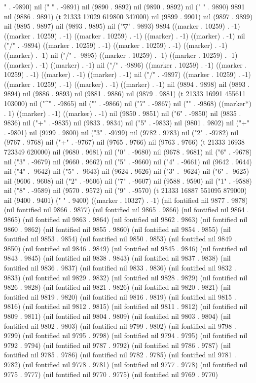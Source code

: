 {{" . -9890) nil (" " . -9891) nil (9890 . 9892) nil (9890 . 9892) nil (" " . 9890) 9891 nil (9886 . 9891) (t 21333 17029 619800 347000) nil (9899 . 9901) nil (9897 . 9899) nil (9895 . 9897) nil (9893 . 9895) nil ("▽" . 9893) 9894 ((marker . 10259) . -1) ((marker . 10259) . -1) ((marker . 10259) . -1) ((marker) . -1) ((marker) . -1) nil ("/" . -9894) ((marker . 10259) . -1) ((marker . 10259) . -1) ((marker) . -1) ((marker) . -1) nil ("/" . -9895) ((marker . 10259) . -1) ((marker . 10259) . -1) ((marker) . -1) ((marker) . -1) nil ("/" . -9896) ((marker . 10259) . -1) ((marker . 10259) . -1) ((marker) . -1) ((marker) . -1) nil ("/" . -9897) ((marker . 10259) . -1) ((marker . 10259) . -1) ((marker) . -1) ((marker) . -1) nil (9894 . 9898) nil (9893 . 9894) nil (9886 . 9893) nil (9881 . 9886) nil (9879 . 9881) (t 21333 16991 455611 103000) nil ("^" . -9865) nil ("{" . -9866) nil ("7" . -9867) nil ("}" . -9868) ((marker*) . 1) ((marker) . -1) ((marker) . -1) nil (9850 . 9851) nil ("6" . -9850) nil (9835 . 9836) nil ("+" . -9835) nil (9833 . 9834) nil ("5" . -9833) nil (9801 . 9802) nil ("+" . -9801) nil (9799 . 9800) nil ("3" . -9799) nil (9782 . 9783) nil ("2" . -9782) nil (9767 . 9768) nil ("+" . -9767) nil (9765 . 9766) nil (9763 . 9766) (t 21333 16938 723349 620000) nil (9680 . 9681) nil ("0" . -9680) nil (9678 . 9681) nil ("6" . -9678) nil ("3" . -9679) nil (9660 . 9662) nil ("5" . -9660) nil ("4" . -9661) nil (9642 . 9644) nil ("4" . -9642) nil ("5" . -9643) nil (9624 . 9626) nil ("3" . -9624) nil ("6" . -9625) nil (9606 . 9608) nil ("2" . -9606) nil ("7" . -9607) nil (9588 . 9590) nil ("1" . -9588) nil ("8" . -9589) nil (9570 . 9572) nil ("9" . -9570) (t 21333 16887 551095 879000) nil (9400 . 9401) ("  " . 9400) ((marker . 10327) . -1) (nil fontified nil 9877 . 9878) (nil fontified nil 9866 . 9877) (nil fontified nil 9865 . 9866) (nil fontified nil 9864 . 9865) (nil fontified nil 9863 . 9864) (nil fontified nil 9862 . 9863) (nil fontified nil 9860 . 9862) (nil fontified nil 9855 . 9860) (nil fontified nil 9854 . 9855) (nil fontified nil 9853 . 9854) (nil fontified nil 9850 . 9853) (nil fontified nil 9849 . 9850) (nil fontified nil 9846 . 9849) (nil fontified nil 9845 . 9846) (nil fontified nil 9843 . 9845) (nil fontified nil 9838 . 9843) (nil fontified nil 9837 . 9838) (nil fontified nil 9836 . 9837) (nil fontified nil 9833 . 9836) (nil fontified nil 9832 . 9833) (nil fontified nil 9829 . 9832) (nil fontified nil 9828 . 9829) (nil fontified nil 9826 . 9828) (nil fontified nil 9821 . 9826) (nil fontified nil 9820 . 9821) (nil fontified nil 9819 . 9820) (nil fontified nil 9816 . 9819) (nil fontified nil 9815 . 9816) (nil fontified nil 9812 . 9815) (nil fontified nil 9811 . 9812) (nil fontified nil 9809 . 9811) (nil fontified nil 9804 . 9809) (nil fontified nil 9803 . 9804) (nil fontified nil 9802 . 9803) (nil fontified nil 9799 . 9802) (nil fontified nil 9798 . 9799) (nil fontified nil 9795 . 9798) (nil fontified nil 9794 . 9795) (nil fontified nil 9792 . 9794) (nil fontified nil 9787 . 9792) (nil fontified nil 9786 . 9787) (nil fontified nil 9785 . 9786) (nil fontified nil 9782 . 9785) (nil fontified nil 9781 . 9782) (nil fontified nil 9778 . 9781) (nil fontified nil 9777 . 9778) (nil fontified nil 9775 . 9777) (nil fontified nil 9770 . 9775) (nil fontified nil 9769 . 9770) }}
